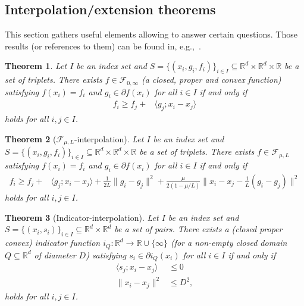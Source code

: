 \documentclass[11pt,a4paper]{article}
\newtheorem{theorem}{Theorem}
\begin{document}
	\subsection{Interpolation/extension theorems}
	This section gathers useful elements allowing to answer certain questions. Those results (or references to them) can be found in, e.g.,~\cite{taylor2015exact,ryu2018operator}.


	\begin{theorem}Let $I$ be an index set and $S=\{(x_i,g_i,f_i)\}_{i\in I}\subseteq \mathbb{R}^d\times\mathbb{R}^d\times \mathbb{R}$ be a set of triplets. There exists $f\in\mathcal{F}_{0,\infty}$ (a closed, proper and convex function) satisfying $f(x_i)=f_i$ and $g_i\in\partial f(x_i)$ for all $i\in I$ if and only if
\begin{equation*}
\begin{aligned}
f_i\geqslant f_j+&\langle g_j;x_i-x_j\rangle
\end{aligned}
\end{equation*}
holds for all $i,j\in I$.
	\end{theorem}
	
	\begin{theorem}[$\mathcal{F}_{\mu,L}$-interpolation]\label{thm:interp_smoothstronglyconvex} Let $I$ be an index set and $S=\{(x_i,g_i,f_i)\}_{i\in I}\subseteq \mathbb{R}^d\times\mathbb{R}^d\times \mathbb{R}$ be a set of triplets. There exists $f\in\mathcal{F}_{\mu,L}$ satisfying $f(x_i)=f_i$ and $g_i\in\partial f(x_i)$ for all $i\in I$ if and only if
\begin{equation*}
\begin{aligned}
f_i\geqslant f_j+&\langle g_j;x_i-x_j\rangle+\frac{1}{2L}\|g_i-g_j\|^2+\frac{\mu}{2(1-\mu/L)}\|x_i-x_j-\tfrac{1}{L}(g_i-g_j)\|^2
\end{aligned}
\end{equation*}
holds for all $i,j\in I$.
\end{theorem}

\begin{theorem}[Indicator-interpolation]\label{thm:interp_indicator} Let $I$ be an index set and $S=\{(x_i,s_i)\}_{i\in I}\subseteq \mathbb{R}^d\times\mathbb{R}^d$ be a set of pairs. There exists a (closed proper convex) indicator function $i_Q:\mathbb{R}^d\rightarrow\mathbb{R}\cup\{\infty\}$ (for a non-empty closed domain $Q\subseteq\mathbb{R}^d$ of diameter $D$) satisfying  $s_i\in\partial i_Q(x_i)$ for all $i\in I$ if and only if
\begin{equation*}
\begin{aligned}
\langle s_j;x_i-x_j\rangle&\leqslant 0\\
 \|x_i-x_j\|^2 &\leqslant D^2,
\end{aligned}
\end{equation*}
holds for all $i,j\in I$.
\end{theorem}
\end{document}
